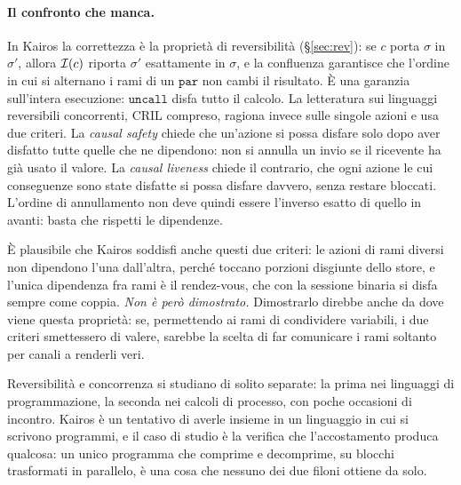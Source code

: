 \paragraph{Il confronto che manca.} In Kairos la correttezza è la proprietà di
reversibilità (\S\ref{sec:rev}): se $c$ porta $\sigma$ in $\sigma'$, allora
$\mathcal{I}(c)$ riporta $\sigma'$ esattamente in $\sigma$, e la confluenza garantisce
che l'ordine in cui si alternano i rami di un $\mathtt{par}$ non cambi il
risultato. È una garanzia sull'intera esecuzione: $\mathtt{uncall}$ disfa tutto
il calcolo. La letteratura sui linguaggi reversibili concorrenti, CRIL compreso,
ragiona invece sulle singole azioni e usa due criteri. La \emph{causal safety}
chiede che un'azione si possa disfare solo dopo aver disfatto tutte quelle che
ne dipendono: non si annulla un invio se il ricevente ha già usato il valore. La
\emph{causal liveness} chiede il contrario, che ogni azione le cui conseguenze
sono state disfatte si possa disfare davvero, senza restare bloccati. L'ordine
di annullamento non deve quindi essere l'inverso esatto di quello in avanti:
basta che rispetti le dipendenze.

È plausibile che Kairos soddisfi anche questi due criteri: le azioni di rami
diversi non dipendono l'una dall'altra, perché toccano porzioni disgiunte dello
store, e l'unica dipendenza fra rami è il rendez-vous, che con la sessione
binaria si disfa sempre come coppia. \emph{Non è però dimostrato.} Dimostrarlo direbbe
anche da dove viene questa proprietà: se, permettendo ai rami di condividere
variabili, i due criteri smettessero di valere, sarebbe la scelta di far
comunicare i rami soltanto per canali a renderli veri.

\bigskip
\noindent
Reversibilità e concorrenza si studiano di solito separate: la prima nei
linguaggi di programmazione, la seconda nei calcoli di processo, con poche
occasioni di incontro. Kairos è un tentativo di averle insieme in un linguaggio
in cui si scrivono programmi, e il caso di studio è la verifica che
l'accostamento produca qualcosa: un unico programma che comprime e decomprime,
su blocchi trasformati in parallelo, è una cosa che nessuno dei due filoni
ottiene da solo.
